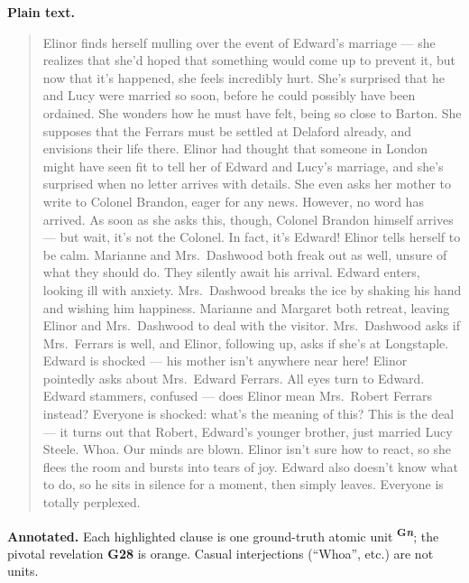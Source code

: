 \documentclass[11pt]{article}
\begin{document}
\noindent\textbf{Plain text.}
\begin{quote}
Elinor finds herself mulling over the event of Edward's marriage --- she realizes
that she'd hoped that something would come up to prevent it, but now that it's
happened, she feels incredibly hurt. She's surprised that he and Lucy were married
so soon, before he could possibly have been ordained. She wonders how he must have
felt, being so close to Barton. She supposes that the Ferrars must be settled at
Delaford already, and envisions their life there. Elinor had thought that someone
in London might have seen fit to tell her of Edward and Lucy's marriage, and she's
surprised when no letter arrives with details. She even asks her mother to write
to Colonel Brandon, eager for any news. However, no word has arrived. As soon as
she asks this, though, Colonel Brandon himself arrives --- but wait, it's not the
Colonel. In fact, it's Edward! Elinor tells herself to be calm. Marianne and
Mrs.~Dashwood both freak out as well, unsure of what they should do. They
silently await his arrival. Edward enters, looking ill with anxiety. Mrs.\
Dashwood breaks the ice by shaking his hand and wishing him happiness. Marianne
and Margaret both retreat, leaving Elinor and Mrs.~Dashwood to deal with the
visitor. Mrs.~Dashwood asks if Mrs.~Ferrars is well, and Elinor, following up,
asks if she's at Longstaple. Edward is shocked --- his mother isn't anywhere near
here! Elinor pointedly asks about Mrs.~Edward Ferrars. All eyes turn to Edward.
Edward stammers, confused --- does Elinor mean Mrs.~Robert Ferrars instead?
Everyone is shocked: what's the meaning of this? This is the deal --- it turns out
that Robert, Edward's younger brother, just married Lucy Steele. Whoa. Our minds
are blown. Elinor isn't sure how to react, so she flees the room and bursts into
tears of joy. Edward also doesn't know what to do, so he sits in silence for a
moment, then simply leaves. Everyone is totally perplexed.
\end{quote}

\noindent\textbf{Annotated.} Each highlighted clause is one ground-truth atomic
unit \textsuperscript{\textbf{\scriptsize G\textit{n}}}; the pivotal revelation
\textbf{G28} is orange. Casual interjections (``Whoa'', etc.) are not units.
\end{document}
